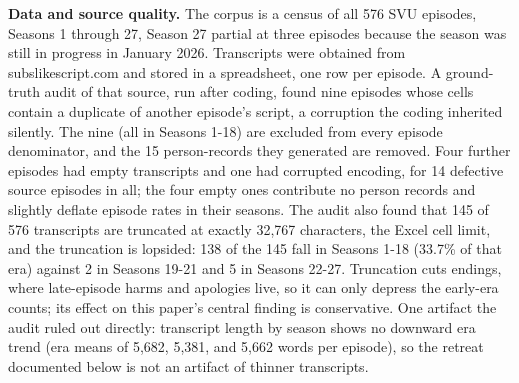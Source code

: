 \documentclass[
]{article}
\begin{document}
\textbf{Data and source quality.} The corpus is a census of all 576 SVU
episodes, Seasons 1 through 27, Season 27 partial at three episodes
because the season was still in progress in January 2026. Transcripts
were obtained from subslikescript.com and stored in a spreadsheet, one
row per episode. A ground-truth audit of that source, run after coding,
found nine episodes whose cells contain a duplicate of another episode's
script, a corruption the coding inherited silently. The nine (all in
Seasons 1-18) are excluded from every episode denominator, and the 15
person-records they generated are removed. Four further episodes had
empty transcripts and one had corrupted encoding, for 14 defective
source episodes in all; the four empty ones contribute no person records
and slightly deflate episode rates in their seasons. The audit also
found that 145 of 576 transcripts are truncated at exactly 32,767
characters, the Excel cell limit, and the truncation is lopsided: 138 of
the 145 fall in Seasons 1-18 (33.7\% of that era) against 2 in Seasons
19-21 and 5 in Seasons 22-27. Truncation cuts endings, where
late-episode harms and apologies live, so it can only depress the
early-era counts; its effect on this paper's central finding is
conservative. One artifact the audit ruled out directly: transcript
length by season shows no downward era trend (era means of 5,682, 5,381,
and 5,662 words per episode), so the retreat documented below is not an
artifact of thinner transcripts.
\end{document}
